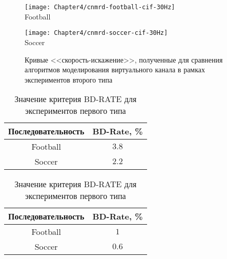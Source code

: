 \begin{figure}[htbp]
    \begin{center}
        \begin{minipage}{0.45\textwidth}
            \centering\texttt{[image: Chapter4/cnmrd-football-cif-30Hz]} \\ Football
        \end{minipage}
        \begin{minipage}{0.45\textwidth}
            \centering\texttt{[image: Chapter4/cnmrd-soccer-cif-30Hz]} \\ Soccer
        \end{minipage}
    \end{center}
    \caption{Кривые <<скорость-искажение>>, полученные для сравнения алгоритмов моделирования виртуального канала в рамках экспериментов второго типа}
    \label{fig:CNM4}
\end{figure}

\begin{table}[htbp]
    \begin{center}
        \caption{Значение критерия BD-RATE для экспериментов первого типа}
        \label{tab:CNMComparisonOracleBDRate}
        \begin{tabular}{|c|c|}
            \hline
            {\bfseries Последовательность } & {\bfseries BD-Rate, \%} \\
            \hline
            Football	& $3.8$	\\
            \hline
            Soccer 		& $2.2$	\\
            \hline
        \end{tabular}
    \end{center}
\end{table}

\begin{table}[htbp]
    \begin{center}
        \caption{Значение критерия BD-RATE для экспериментов первого типа}
        \label{tab:CNMComparisonBDRate}
        \begin{tabular}{|c|c|}
            \hline
            {\bfseries Последовательность } & {\bfseries BD-Rate, \%} \\
            \hline
            Football	& $1$	\\
            \hline
            Soccer 		& $0.6$	\\
            \hline
        \end{tabular}
    \end{center}
\end{table}


